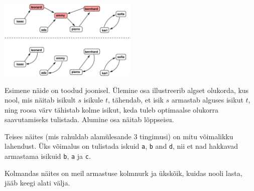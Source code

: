 \section*{\sampleexplanations}

\begin{center}
\includegraphics[width=0.5\textwidth]{polygonfig.pdf}
\end{center}

Esimene näide on toodud joonisel. Ülemine osa illustreerib algset olukorda, kus nool, mis näitab isikult $s$ isikule $t$, 
tähendab, et isik $s$ armastab alguses isikut $t$, ning roosa värv tähistab kolme isikut, keda tuleb optimaalse olukorra 
saavutamiseks tulistada. Alumine osa näitab lõppseisu.

Teises näites (mis rahuldab alamülesande 3 tingimusi) on mitu võimalikku lahendust.
Üks võimalus on tulistada iskuid \texttt{a}, \texttt{b} and \texttt{d}, nii et nad hakkavad armastama isikuid \texttt{b}, \texttt{a} ja \texttt{c}.

Kolmandas näites on meil armastuse kolmnurk ja ükskõik, kuidas nooli lasta, jääb keegi alati välja.
